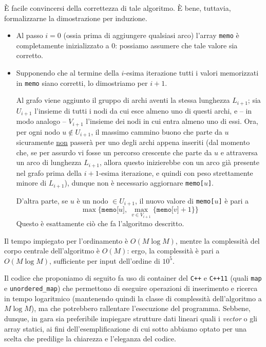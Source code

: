     È facile convincersi della correttezza di tale algoritmo. È bene, tuttavia, formalizzarne la dimostrazione per induzione.
    \begin{itemize}
        \item Al passo $i = 0$ (ossia prima di aggiungere qualsiasi arco) l'array \texttt{memo} è completamente inizializzato a $0$: possiamo assumere che tale valore sia corretto.
        \item Supponendo che al termine della $i$-esima iterazione tutti i valori memorizzati in \texttt{memo} siano corretti, lo dimostriamo per $i + 1$.
        
        Al grafo viene aggiunto il gruppo di archi aventi la stessa lunghezza $L_{i + 1}$; sia $U_{i + 1}$ l'insieme di tutti i nodi da cui esce almeno uno di questi archi, e -- in modo analogo -- $V_{i + 1}$ l'insieme dei nodi in cui entra almeno uno di essi. Ora, per ogni nodo $u \not \in U_{i + 1}$, il massimo cammino buono che parte da $u$ sicuramente \underline{non} passerà per uno degli archi appena inseriti (dal momento che, se per assurdo vi fosse un percorso crescente che parte da $u$ e attraversa un arco di lunghezza $L_{i + 1}$, allora questo inizierebbe con un arco già presente nel grafo prima della $i + 1$-esima iterazione, e quindi con peso strettamente minore di $L_{i + 1}$), dunque non è necessario aggiornare \texttt{memo[$u$]}.
        
        D'altra parte, se $u$ è un nodo $\in U_{i + 1}$, il nuovo valore di \texttt{memo[$u$]} è pari a \[ \max \{ \texttt{memo[$u$]}, \: \underset{v \in V_{i + 1}}{\max} \{ \texttt{memo[$v$]} + 1 \} \} \] Questo è esattamente ciò che fa l'algoritmo descritto.
    \end{itemize}
    
    Il tempo impiegato per l'ordinamento è $O(M \log M)$, mentre la complessità del corpo centrale dell'algoritmo è $O(M)$: ergo, la complessità è pari a $O(M \log M)$, sufficiente per input dell'ordine di $10^5$.
    
    \newpage
    
    \MlogM
    
    Il codice che proponiamo di seguito fa uso di container del \texttt{C++} e \texttt{C++11} (quali \texttt{map} e \texttt{unordered\_map}) che permettono di eseguire operazioni di inserimento e ricerca in tempo logaritmico (mantenendo quindi la classe di complessità dell'algoritmo a $M \log M$), ma che potrebbero rallentare l'esecuzione del programma. Sebbene, dunque, in gara sia preferibile impiegare strutture dati lineari quali i \textit{vector} o gli array statici, ai fini dell'esemplificazione di cui sotto abbiamo optato per una scelta che predilige la chiarezza e l'eleganza del codice.
    
